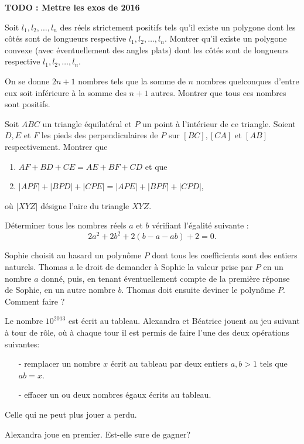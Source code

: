 \textbf{TODO : Mettre les exos de 2016}


\begin{exo}{} Soit $l_1,l_2,\ldots,l_n$ des réels strictement positifs
tels qu'il existe un polygone dont les côtés sont de longueurs
respective $l_1,l_2,\ldots,l_n$. Montrer qu'il existe un polygone
convexe (avec éventuellement des angles plats) dont les côtés sont de
longueurs respective $l_1,l_2,\ldots,l_n$.
\end{exo}

\begin{exo}{}On se donne $2n+1$ nombres tels que la somme de $n$ nombres quelconques d'entre eux soit inférieure à la somme des $n+1$ autres. Montrer que tous ces nombres sont positifs.
\end{exo}

\begin{exo}{}Soit $ABC$ un triangle équilatéral et $P$ un point à l'intérieur de ce triangle. Soient $D,E$ et $F$ les pieds des perpendiculaires de $P$ sur $[BC],[CA]$ et $[AB]$ respectivement. Montrer que
\begin{enumerate}
	\item $AF+BD+CE=AE+BF+CD$ et que
	\item $|APF|+|BPD|+|CPE|=|APE|+|BPF|+|CPD|$,
\end{enumerate}
où $|XYZ|$ désigne l'aire du triangle $XYZ$.
\end{exo}

\begin{exo}{}Déterminer tous les nombres réels $a$ et $b$ vérifiant l'égalité suivante :
$$2a^{2}+2b^{2}+2(b-a-ab)+2=0.$$
\end{exo}

\begin{exo}{}Sophie choisit au hasard un polynôme $P$
dont tous les coefficients sont des entiers naturels. Thomas a le
droit de demander à Sophie la valeur prise par $P$ en un nombre $a$
donné, puis, en tenant éventuellement compte de la première réponse
de Sophie, en un autre nombre $b$. Thomas doit ensuite deviner le
polynôme $P$. Comment faire ? 
\end{exo}

\begin{exo}{}
Le nombre $10^{2013}$ est écrit au tableau. Alexandra et Béatrice jouent au jeu suivant à tour de rôle, où à chaque tour il est permis de faire l'une des deux opérations suivantes:
\begin{enumerate}
 \item[-] remplacer un nombre $x$ écrit au tableau par deux entiers $a,b>1$ tels que $ab=x$.
 \item[-] effacer un ou deux nombres égaux écrits au tableau.
  \end{enumerate}
Celle qui ne peut plus jouer a perdu. 

\smallskip

Alexandra joue en premier. Est-elle sure de gagner?
\end{exo}


